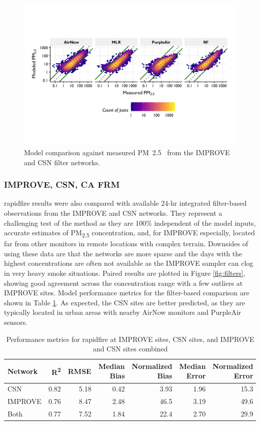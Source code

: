 \documentclass[gmd, manuscript]{copernicus}
\begin{document}
\begin{figure}
\includegraphics[width=12cm]{./Figures/MethodComparisonGMD} \caption{Model comparison against measured PM~2.5~ from the IMPROVE and CSN filter networks.}\label{fig:methods}
\end{figure}

\subsubsection{IMPROVE, CSN, CA FRM}

rapidfire results were also compared with available 24-hr integrated
filter-based observations from the IMPROVE and CSN networks. They
represent a challenging test of the method as they are 100\% independent
of the model inputs, accurate estimates of PM\textsubscript{2.5}
concentration, and, for IMPROVE especially, located far from other
monitors in remote locations with complex terrain. Downsides of using
these data are that the networks are more sparse and the days with the
highest concentrations are often not available as the IMPROVE sampler
can clog in very heavy smoke situations. Paired results are plotted in
Figure \ref{fig:filters}, showing good agreement across the
concentration range with a few outliers at IMPROVE sites. Model
performance metrics for the filter-based comparison are shown in Table
\ref{table:4}. As expected, the CSN sites are better predicted, as they
are typically located in urban areas with nearby AirNow monitors and
PurpleAir sensors.

\begin{table}[h]
\caption{Performance metrics for rapidfire at IMPROVE sites, CSN sites, and IMPROVE and CSN sites combined}
\begin{tabular}{lrrrrrr}
Network     & R\textsuperscript{2}    & RMSE    & Median Bias    & Normalized Bias   & Median Error   & Normalized Error    \\ \hline
CSN     & 0.82  & 5.18    & 0.42   & 3.93  & 1.96 & 15.3  \\
IMPROVE & 0.76  & 8.47    & 2.48   & 46.5  & 3.19 & 49.6   \\
Both    & 0.77  & 7.52    & 1.84   & 22.4  & 2.70 & 29.9
\end{tabular}
\label{table:4}
\end{table}
\end{document}
